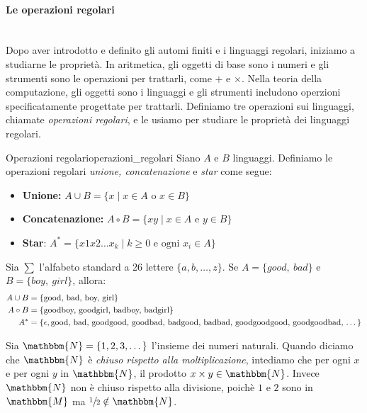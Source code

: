 \documentclass[12pt]{report}
\newcounter{definition}
\newcommand{\nmu}{}
\begin{document}
	\paragraph{Le operazioni regolari} \quad \\
	Dopo aver introdotto e definito gli automi finiti e i linguaggi regolari, iniziamo a studiarne le proprietà. In aritmetica, gli oggetti di base sono i numeri e gli strumenti sono le operazioni per trattarli, come $+$ e $\times$. Nella teoria della computazione, gli oggetti sono i linguaggi e gli strumenti includono operzioni specificatamente progettate per trattarli. Definiamo tre operazioni sui linguaggi, chiamate \textit{operazioni regolari}, e le usiamo per studiare le proprietà dei linguaggi regolari.
	\begin{definition}{\nmu Operazioni regolari}{operazioni_regolari}
		Siano $A$ e $B$ linguaggi. Definiamo le operazioni regolari \textit{unione, concatenazione} e \textit{star} come segue:
		\begin{itemize}
			\item \textbf{Unione:} $A \cup B = \{x \mid x \in A \text{ o } x \in B\}$
			\item \textbf{Concatenazione:} $A \circ B = \{xy \mid x \in A \text{ e } y \in B\}$
			\item \textbf{Star}: $A^* = \{x1x2\dots x_k \mid k \geq 0 \text{ e ogni } x_i \in A\}$
		\end{itemize}
	\end{definition}
	\begin{example}{}{}
		Sia $\sum$ l'alfabeto standard a 26 lettere $\{a, b, \dots, z\}$. Se $A = \{good,\ bad\}$ e $B = \{boy,\ girl\}$, allora:
		\begin{align*}
			A \cup B &= \{\text{good, bad, boy, girl}\} \\
			A \circ B &= \{\text{goodboy, goodgirl, badboy, badgirl}\} \\
			A^* &= \{\epsilon, \text{good, bad, goodgood, goodbad, badgood, badbad, goodgoodgood, goodgoodbad, \dots }\}
		\end{align*}
	\end{example}
	Sia $\mathbbm{N} = \{1, 2, 3, \dots\}$ l'insieme dei numeri naturali. Quando diciamo che $\mathbbm{N}$ è \textit{chiuso rispetto alla moltiplicazione}, intediamo che per ogni $x$ e per ogni $y$ in $\mathbbm{N}$, il prodotto $x \times y \in \mathbbm{N}$. Invece $\mathbbm{N}$ non è chiuso rispetto alla divisione, poichè $1$ e $2$ sono in $\mathbbm{M}$ ma $\sfrac{1}{2} \notin \mathbbm{N}$.  \\
\end{document}
